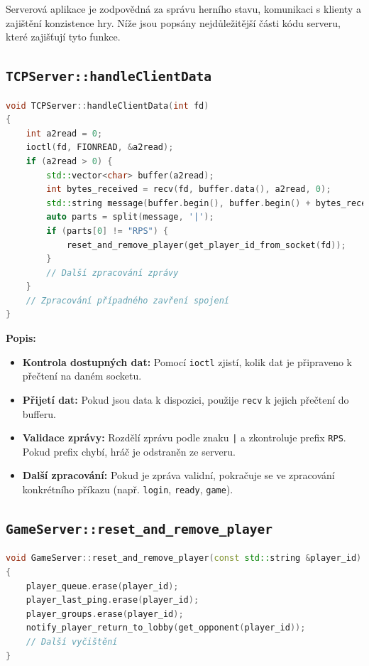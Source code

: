 \documentclass[12pt, a4paper]{article}
\begin{document}
Serverová aplikace je zodpovědná za správu herního stavu, komunikaci s klienty a zajištění konzistence hry. Níže jsou popsány nejdůležitější části kódu serveru, které zajišťují tyto funkce.

\subsection{\texttt{TCPServer::handleClientData}}
\begin{lstlisting}[language=C++, caption={Zpracování dat od klienta}]
void TCPServer::handleClientData(int fd)
{
    int a2read = 0;
    ioctl(fd, FIONREAD, &a2read);
    if (a2read > 0) {
        std::vector<char> buffer(a2read);
        int bytes_received = recv(fd, buffer.data(), a2read, 0);
        std::string message(buffer.begin(), buffer.begin() + bytes_received);
        auto parts = split(message, '|');
        if (parts[0] != "RPS") {
            reset_and_remove_player(get_player_id_from_socket(fd));
        }
        // Další zpracování zprávy
    }
    // Zpracování případného zavření spojení
}
\end{lstlisting}

\noindent
\textbf{Popis:}
\begin{itemize}
    \item \textbf{Kontrola dostupných dat:} Pomocí \texttt{ioctl} zjistí, kolik dat je připraveno k přečtení na daném socketu.
    \item \textbf{Přijetí dat:} Pokud jsou data k dispozici, použije \texttt{recv} k jejich přečtení do bufferu.
    \item \textbf{Validace zprávy:} Rozdělí zprávu podle znaku \texttt{|} a zkontroluje prefix \texttt{RPS}. Pokud prefix chybí, hráč je odstraněn ze serveru.
    \item \textbf{Další zpracování:} Pokud je zpráva validní, pokračuje se ve zpracování konkrétního příkazu (např. \texttt{login}, \texttt{ready}, \texttt{game}).
\end{itemize}

\subsection{\texttt{GameServer::reset\_and\_remove\_player}}
\begin{lstlisting}[language=C++, caption={Resetování a odstranění hráče}]
void GameServer::reset_and_remove_player(const std::string &player_id)
{
    player_queue.erase(player_id);
    player_last_ping.erase(player_id);
    player_groups.erase(player_id);
    notify_player_return_to_lobby(get_opponent(player_id));
    // Další vyčištění
}
\end{lstlisting}
\end{document}
